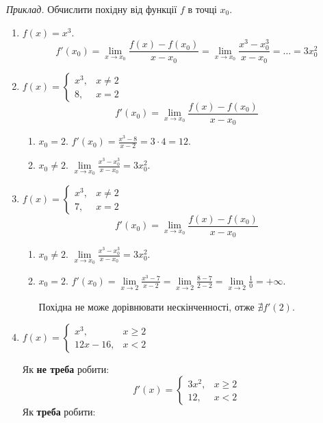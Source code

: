 \documentclass[12pt]{report}
\begin{document}
\textit{Приклад.} Обчислити похідну від функції $f$ в точці $x_0$.
\begin{enumerate}

\item $f(x) = x^3$.
$$f'(x_0) = \lim_{x\to x_0}\frac{f(x) - f(x_0)}{x - x_0} = \lim_{x\to x_0}\frac{x^3 - x_0^3}{x - x_0} = \ldots = 3 x_0^2$$

\item $f(x) = \begin{cases} x^3,& x \neq 2 \\ 8, & x = 2\end{cases}$
$$f'(x_0) = \lim_{x \to x_0}\frac{f(x) - f(x_0)}{x - x_0}$$
\begin{enumerate}
\item $x_0 = 2$. $f'(x_0) = \frac{x^3 - 8}{x - 2} = 3 \cdot 4 = 12.$
\item $x_0 \neq 2$. $\lim\limits_{x \to x_0} \frac{x^3 - x_0^3}{x - x_0} = 3 x_0^2$. 
\end{enumerate}

\item $f(x) = \begin{cases} x^3,& x \neq 2 \\ 7, & x = 2\end{cases}$
$$f'(x_0) = \lim_{x \to x_0}\frac{f(x) - f(x_0)}{x - x_0}$$
\begin{enumerate}
\item $x_0 \neq 2$. $\lim\limits_{x \to x_0} \frac{x^3 - x_0^3}{x - x_0} = 3 x_0^2$. 
\item $x_0 = 2$. $f'(x_0) = \lim\limits_{x\to 2}\frac{x^3 - 7}{x - 2} = \lim\limits_{x\to 2}\frac{8 - 7}{2 - 2} = \lim\limits_{x\to 2}\frac{1}{0} = +\infty$.

Похідна не може дорівнювати нескінченності, отже $\nexists f'(2)$. 
\end{enumerate}

\item $f(x) = \begin{cases} x^3,& x \geq 2 \\ 12x - 16, & x < 2\end{cases}$

Як \textbf{не треба} робити:
$$f'(x) = \begin{cases} 3 x^2,& x \geq 2 \\ 12, & x < 2\end{cases}$$
Як \textbf{треба} робити:

\vspace{1mm}


\end{enumerate}
\end{document}
